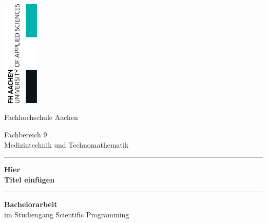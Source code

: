 \begin{titlepage}

	\thispagestyle{empty}
	
	\begin{flushright}
		\includegraphics[width=1.7cm]{./pic/FHAC.jpg}
	\end{flushright}
	
	\vspace{-2.5cm}

	\centering \begin{bfseries} \Large Fachhochschule Aachen\\ \end{bfseries}

	\vspace{1.5cm}
	\normalsize
	Fachbereich 9\\
	Medizintechnik und Technomathematik
	
	\vspace{0.5cm}
	
	\centering \rule{0.75\textwidth}{1pt}
	
	\vspace{1cm}

	\centering \begin{minipage}[t]{17cm}
		\centering \bfseries \huge Hier\\Titel einfügen		\medskip
	\end{minipage}

	\vspace{1cm}
	
	\centering \rule{0.75\textwidth}{1pt}
	
	\vspace{1cm}
	
	
	\centering \textbf{Bachelorarbeit}\\
	\centering im Studiengang Scientific Programming

	\vspace{1cm}


\end{titlepage}
